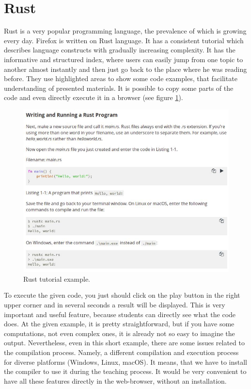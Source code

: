 \section{Rust} \label{sec:rust}
Rust \cite{Rust, klabnik2018rust} is a very popular programming language, the prevalence of which is growing every day. Firefox is written on Rust language. It has a consistent tutorial which describes language constructs with gradually increasing complexity. It has the informative and structured index, where users can easily jump from one topic to another almost instantly and then just go back to the place where he was reading before. They use highlighted areas to show some code examples, that facilitate understanding of presented materials. It is possible to copy some parts of the code and even directly execute it in a browser (see figure \ref{fig:rust}).
\begin{figure}[h!]
    \centering
    \includegraphics[width=0.7\linewidth]{src/pic/rust}
    \caption{Rust tutorial example.}
    \label{fig:rust}
\end{figure} \newline
To execute the given code, you just should click on the play button in the right upper corner and in several seconds a result will be displayed. This is very important and useful feature, because students can directly see what the code does. At the given example, it is pretty straightforward, but if you have some computations, not even complex ones, it is already not so easy to imagine the output. Nevertheless, even in this short example, there are some issues related to the compilation process. Namely, a different compilation and execution process for diverse platforms (Windows, Linux, macOS). It means, that we have to install the compiler to use it during the teaching process. It would be very convenient to have all these features directly in the web-browser, without an installation.

